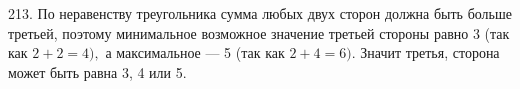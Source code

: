 213. По неравенству треугольника сумма любых двух сторон должна быть больше третьей, поэтому минимальное возможное значение третьей стороны равно 3 (так как $2+2=4),$ а максимальное --- 5 (так как $2+4=6).$ Значит третья, сторона может быть равна 3, 4 или 5.\\

